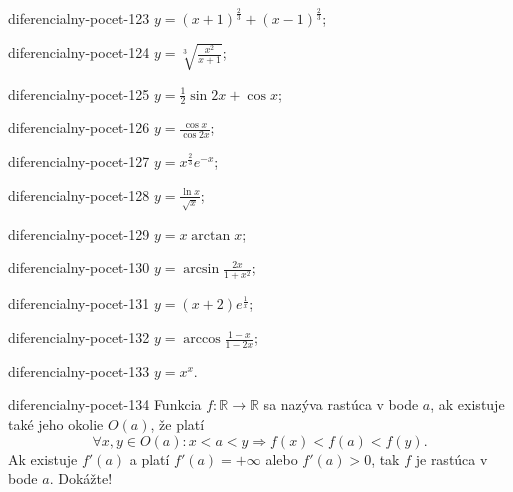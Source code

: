 \begin{defproblem}{diferencialny-pocet-123}
$y=(x+1)^{\frac{2}{3}}+(x-1)^{\frac{2}{3}}$;
\end{defproblem}

\begin{defproblem}{diferencialny-pocet-124}
$y=\sqrt[3]{\frac{x^2}{x+1}}$;
\end{defproblem}

\begin{defproblem}{diferencialny-pocet-125}
$y=\frac{1}{2}\sin 2x +\cos x$;
\end{defproblem}

\begin{defproblem}{diferencialny-pocet-126}
$y=\frac{\cos x}{\cos 2x}$;
\end{defproblem}

\begin{defproblem}{diferencialny-pocet-127}
$y=x^{\frac{2}{3}}e^{-x}$;
\end{defproblem}

\begin{defproblem}{diferencialny-pocet-128}
$y=\frac{\ln x}{\sqrt{x}}$;
\end{defproblem}

\begin{defproblem}{diferencialny-pocet-129}
$y=x\arctan x$;
\end{defproblem}

\begin{defproblem}{diferencialny-pocet-130}
$y=\arcsin \frac{2x}{1+x^2}$;
\end{defproblem}

\begin{defproblem}{diferencialny-pocet-131}
$y=(x+2)e^{\frac{1}{x}}$;
\end{defproblem}

\begin{defproblem}{diferencialny-pocet-132}
$y=\arccos \frac{1-x}{1-2x}$;
\end{defproblem}

\begin{defproblem}{diferencialny-pocet-133}
$y=x^x$.
\end{defproblem}

\begin{defproblem}{diferencialny-pocet-134}
Funkcia $f:\mathbb{R}\rightarrow\mathbb{R}$ sa nazýva rastúca v bode $a$, ak existuje také jeho okolie $O(a)$, že platí
$$\forall x,y\in O(a):x<a<y\Rightarrow f(x)<f(a)<f(y).$$
Ak existuje $f'(a)$ a platí $f'(a)=+\infty$ alebo $f'(a)>0$, tak $f$ je rastúca v bode $a$. Dokážte!
\end{defproblem}

